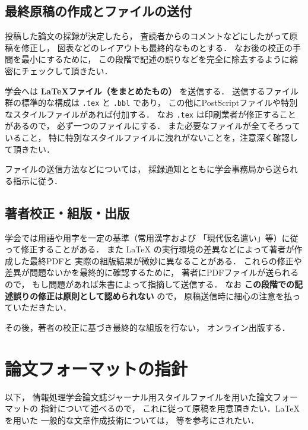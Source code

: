 \documentclass[submit]{ipsj}
\begin{document}
\subsection{最終原稿の作成とファイルの送付}\label{ux6700ux7d42ux539fux7a3fux306eux4f5cux6210ux3068ux30d5ux30a1ux30a4ux30ebux306eux9001ux4ed8}

投稿した論文の採録が決定したら， 査読者からのコメントなどにしたがって原稿を修正し， 図表などのレイアウトも最終的なものとする． なお後の校正の手間を最小にするために， この段階で記述の誤りなどを完全に除去するように綿密にチェックして頂きたい．

学会へは \textbf{LaTeXファイル（をまとめたもの）} を送信する． 送信するファイル群の標準的な構成は \texttt{.tex} と \texttt{.bbl} であり， この他にPostScriptファイルや特別なスタイルファイルがあれば付加する． なお \texttt{.tex} は印刷業者が修正することがあるので， 必ず一つのファイルにする． また必要なファイルが全てそろっていること， 特に特別なスタイルファイルに洩れがないことを，注意深く確認して頂きたい．

ファイルの送信方法などについては， 採録通知とともに学会事務局から送られる指示に従う．

\subsection{著者校正・組版・出版}\label{ux8457ux8005ux6821ux6b63ux7d44ux7248ux51faux7248}

学会では用語や用字を一定の基準（常用漢字および 「現代仮名遣い」等）に従って修正することがある． また LaTeX の実行環境の差異などによって著者が作成した最終PDFと 実際の組版結果が微妙に異なることがある． これらの修正や差異が問題ないかを最終的に確認するために， 著者にPDFファイルが送られるので， もし問題があれば朱書によって指摘して送信する． なお \textbf{この段階での記述誤りの修正は原則として認められない} ので， 原稿送信時に細心の注意を払っていただきたい．

その後，著者の校正に基づき最終的な組版を行ない， オンライン出版する．

\section{論文フォーマットの指針}\label{sec:format}

以下， 情報処理学会論文誌ジャーナル用スタイルファイルを用いた論文フォーマットの 指針について述べるので， これに従って原稿を用意頂きたい．LaTeX を用いた 一般的な文章作成技術については，\citep{okumura, companion} 等を参考にされたい．
\end{document}
